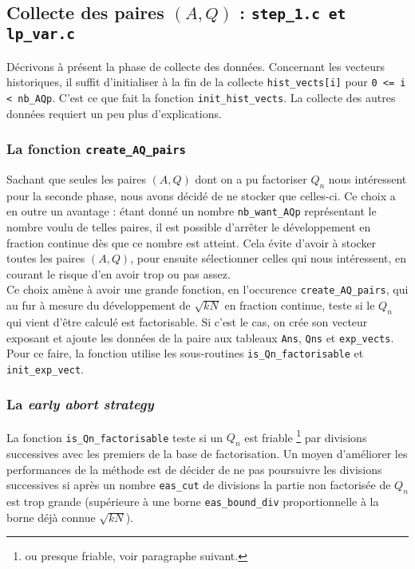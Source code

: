 \subsection{Collecte des paires $(A,Q)$ : \texttt{step\_1.c et lp\_var.c}}

Décrivons à présent la phase de collecte des données. Concernant les vecteurs
historiques, il suffit d'initialiser à la fin de la 
collecte \texttt{hist\_vects[i]} pour \texttt{0 <= i < nb\_AQp}. C'est ce que fait 
la fonction \texttt{init\_hist\_vects}. La collecte des autres données 
requiert un peu plus d'explications. 

\subsubsection{La fonction \texttt{create\_AQ\_pairs}}

Sachant que seules les paires $(A,Q)$ dont on a pu factoriser $Q_n$ nous
intéressent pour la seconde phase, nous avons décidé de ne stocker que celles-ci.
Ce choix a en outre un avantage : étant donné un nombre \texttt{nb\_want\_AQp}
représentant le nombre voulu de telles paires, il est possible d'arrêter le 
développement en fraction continue dès que ce nombre est atteint. Cela évite
d'avoir à stocker toutes les paires $(A,Q)$, pour ensuite sélectionner celles 
qui nous intéressent, en courant le risque d'en avoir trop ou pas assez. \\

Ce choix amène à avoir une grande fonction, en l'occurence 
\texttt{create\_AQ\_pairs}, qui au fur à mesure du développement de $\sqrt{kN}$
en fraction continue, teste si le $Q_n$ qui vient d'être calculé est factorisable.
Si c'est le cas, on crée son vecteur exposant et ajoute les données de la paire
aux tableaux \texttt{Ans}, \texttt{Qns} et \texttt{exp\_vects}. Pour ce faire, la
fonction utilise les sous-routines \texttt{is\_Qn\_factorisable} et 
\texttt{init\_exp\_vect}.

\subsubsection{La \textit{early abort strategy}}

La fonction \texttt{is\_Qn\_factorisable} teste si un $Q_n$ est friable 
\footnote {ou presque friable, voir paragraphe suivant.} par divisions successives
avec les premiers de la base de factorisation.  Un moyen d'améliorer les 
performances de la méthode est de décider de ne pas poursuivre les divisions 
successives si après un nombre \texttt{eas\_cut} de divisions la partie non
factorisée de $Q_n$ est trop grande (supérieure à une borne 
\texttt{eas\_bound\_div} proportionnelle à la borne déjà connue $\sqrt{kN}$). 

